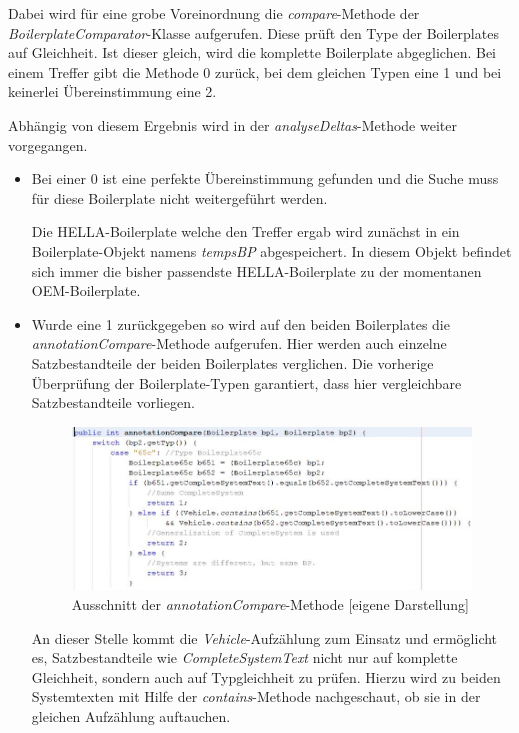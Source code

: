 \documentclass[12pt]{report}
\begin{document}
Dabei wird für eine grobe Voreinordnung die \textit{compare}-Methode der \textit{BoilerplateComparator}-Klasse aufgerufen. Diese prüft den Type der Boilerplates auf Gleichheit. Ist dieser gleich, wird die komplette Boilerplate abgeglichen. Bei einem Treffer gibt die Methode 0 zurück, bei dem gleichen Typen eine 1 und bei keinerlei Übereinstimmung eine 2. 

Abhängig von diesem Ergebnis wird in der \textit{analyseDeltas}-Methode weiter vorgegangen.

\begin{itemize}
\item
Bei einer 0 ist eine perfekte Übereinstimmung gefunden und die Suche muss für diese Boilerplate nicht weitergeführt werden.

Die HELLA-Boilerplate welche den Treffer ergab wird zunächst in ein Boilerplate-Objekt namens \textit{tempsBP} abgespeichert. In diesem Objekt befindet sich immer die bisher passendste HELLA-Boilerplate zu der momentanen OEM-Boilerplate. 

\item 
Wurde eine 1 zurückgegeben so wird auf den beiden Boilerplates die \textit{annotationCompare}-Methode aufgerufen. Hier werden auch einzelne Satzbestandteile der beiden Boilerplates verglichen. Die vorherige Überprüfung der Boilerplate-Typen garantiert, dass hier vergleichbare Satzbestandteile vorliegen. 

\begin{figure}[H]
\begin{center}
\includegraphics[scale=0.7]{Bilder/annotationCompare.jpg}
\caption{Ausschnitt der \textit{annotationCompare}-Methode [eigene Darstellung]}
\end{center}
\end{figure}

An dieser Stelle kommt die \textit{Vehicle}-Aufzählung zum Einsatz und ermöglicht es, Satzbestandteile wie \textit{CompleteSystemText} nicht nur auf komplette Gleichheit, sondern auch auf Typgleichheit zu prüfen. Hierzu wird zu beiden Systemtexten mit Hilfe der \textit{contains}-Methode nachgeschaut, ob sie in der gleichen Aufzählung auftauchen. 


\end{itemize}
\end{document}
